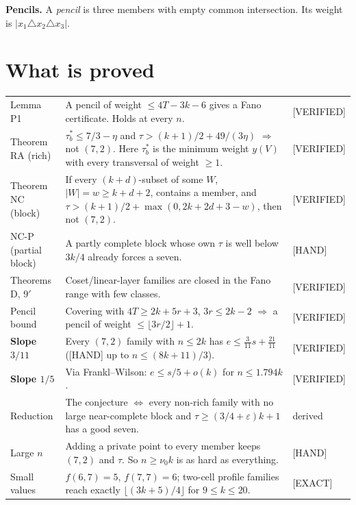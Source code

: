 \documentclass[11pt]{article}
\newcommand{\st}[1]{\textsf{\small[#1]}}
\begin{document}
\noindent\textbf{Pencils.} A \emph{pencil} is three members with empty common intersection. Its weight is
$|x_1\triangle x_2\triangle x_3|$.

\section{What is proved}
\begin{center}\small
\begin{tabular}{p{}p{}l}
\toprule
Lemma P1 & A pencil of weight $\le4T-3k-6$ gives a Fano certificate. Holds at every $n$. & \st{VERIFIED}\\
Theorem RA (rich) & $\tau^*_b\le7/3-\eta$ and $\tau>(k+1)/2+49/(3\eta)$ $\Rightarrow$ not $(7,2)$. Here $\tau^*_b$ is the minimum weight $y(V)$ with every transversal of weight $\ge1$. & \st{VERIFIED}\\
Theorem NC (block) & If every $(k+d)$-subset of some $W$, $|W|=w\ge k+d+2$, contains a member, and $\tau>(k+1)/2+\max(0,2k+2d+3-w)$, then not $(7,2)$. & \st{VERIFIED}\\
NC-P (partial block) & A partly complete block whose own $\tau$ is well below $3k/4$ already forces a seven. & \st{HAND}\\
Theorems D, $9'$ & Coset/linear-layer families are closed in the Fano range with few classes. & \st{VERIFIED}\\
Pencil bound & Covering with $4T\ge2k+5r+3$, $3r\le2k-2$ $\Rightarrow$ a pencil of weight $\le\lfloor3r/2\rfloor+1$. & \st{VERIFIED}\\
\textbf{Slope $3/11$} & Every $(7,2)$ family with $n\le2k$ has $e\le\tfrac3{11}s+\tfrac{21}{11}$ (\st{HAND} up to $n\le(8k+11)/3$). & \st{VERIFIED}\\
\textbf{Slope $1/5$} & Via Frankl--Wilson: $e\le s/5+o(k)$ for $n\le1.794k$. & \st{VERIFIED}\\
Reduction & The conjecture $\iff$ every non-rich family with no large near-complete block and $\tau\ge(3/4+\varepsilon)k+1$ has a good seven. & derived\\
Large $n$ & Adding a private point to every member keeps $(7,2)$ and $\tau$. So $n\ge\nu_0k$ is as hard as everything. & \st{HAND}\\
Small values & $f(6,7)=5$, $f(7,7)=6$; two-cell profile families reach exactly $\lfloor(3k+5)/4\rfloor$ for $9\le k\le20$. & \st{EXACT}\\
\bottomrule
\end{tabular}\end{center}
\end{document}
